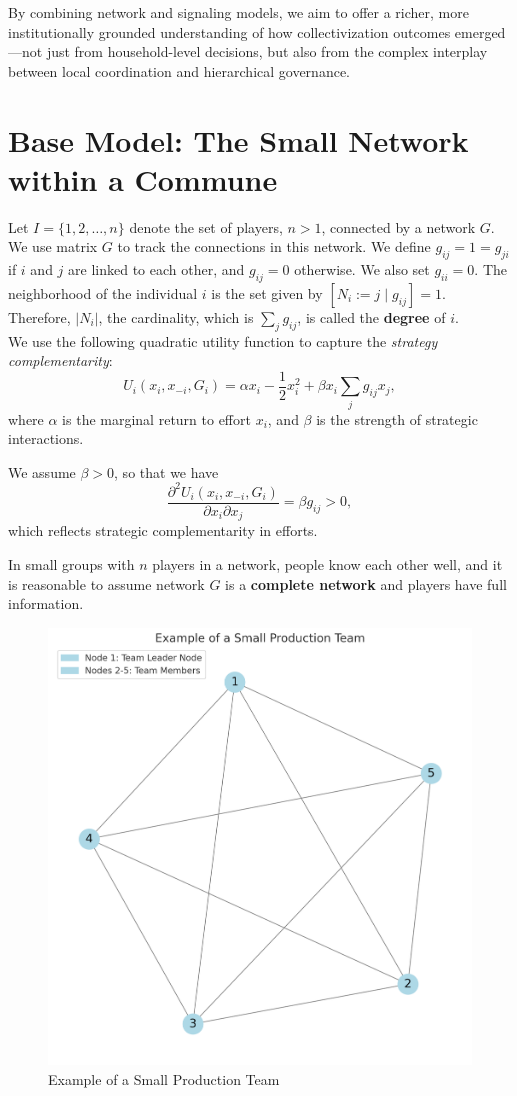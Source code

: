 \documentclass[12pt]{article}
\begin{document}
By combining network and signaling models, we aim to offer a richer, more institutionally grounded understanding of how collectivization outcomes emerged—not just from household-level decisions, but also from the complex interplay between local coordination and hierarchical governance.\\

\section{Base Model: The Small Network within a Commune}
Let $I = \{1, 2, \dots, n\}$ denote the set of players, $n > 1$, connected by a network $G$. We use matrix $G$ to track the connections in this network. We define $g_{ij} = 1=g_{ji}$ if $i$ and $j$ are linked to each other, and $g_{ij} = 0$ otherwise.  We also set $g_{ii} = 0$. The neighborhood of the individual $i$ is the set given by $[ N_i := j \mid g_{ij}] = 1$. Therefore, $|N_i|$, the cardinality, which is $\sum_j g_{ij}$, is called the \textbf{degree} of $i$.\\

We use the following quadratic utility function to capture the \emph{strategy complementarity}:
\[
U_i(x_i, x_{-i}, G_i) = \alpha x_i - \frac{1}{2} x_i^2 + \beta x_i \sum_j g_{ij} x_j,
\]
where $\alpha$ is the marginal return to effort $x_i$, and $\beta$ is the strength of strategic interactions.

We assume $\beta > 0$, so that we have
\[
\frac{\partial^2 U_i(x_i, x_{-i}, G_i)}{\partial x_i \partial x_j} = \beta g_{ij} > 0,
\]
which reflects strategic complementarity in efforts.

In small groups with $n$ players in a network, people know each other well, and it is reasonable to assume network $G$ is a \textbf{complete network} and players have full information.

\begin{figure}[H]
  \centering
  \includegraphics[height=0.6\textwidth]{small network1.png}
  \caption{Example of a Small Production Team}
  \label{fig:small-team}
\end{figure}
\end{document}
